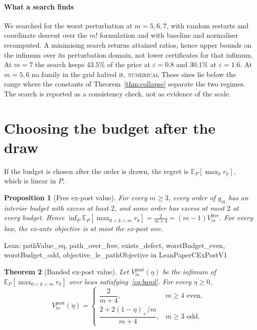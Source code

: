 \documentclass[conference]{IEEEtran}
\newtheorem{theorem}{Theorem}
\newtheorem{proposition}[theorem]{Proposition}
\theoremstyle{definition}
\newcommand{\lean}[1]{\textsf{\footnotesize #1}}
\newcommand{\leanbox}[1]{%
  \par\vspace{2pt}\noindent
  {\raggedright\footnotesize\textsf{Lean: #1}\par}\vspace{2pt}}
\newcommand{\NUM}{\textsc{numerical}}
\begin{document}
\paragraph{What a search finds}
We searched for the worst perturbation at $m=5,6,7$, with random restarts and coordinate
descent over the $m!$ formulation and with baseline and normaliser recomputed. A minimising search returns
attained ratios, hence upper bounds on the infimum over its perturbation domain, not lower
certificates for that infimum. At $m=7$ the search keeps $43.5\%$
of the price at $\varepsilon=0.8$ and $30.1\%$ at $\varepsilon=1.6$. At $m=5,6$ no family in
the grid halved it. \NUM{} These sizes lie below the range where the constants of
Theorem~\ref{thm:collapse} separate the two regimes. The search is reported as a consistency
check, not as evidence of the scale.

\section{Choosing the budget after the draw}
\label{sec:expost}

If the budget is chosen after the order is drawn, the regret is
$\mathbb{E}_{P}[\max_{k}r_{k}]$, which is linear in $P$.

\begin{proposition}[Free ex-post value]
\label{prop:expost}
For every $m\ge3$, every order of $g_{m}$ has an interior budget with excess at least $2$,
and some order has excess at most $2$ at every budget. Hence
$\inf_{P}\mathbb{E}_{P}[\max_{0<k<m}r_{k}]=\frac{2}{m+4}=(m-1)V^{\mathrm{free}}_{m}$. For
every law, the ex-ante objective is at most the ex-post one.
\end{proposition}

\leanbox{\lean{pathValue\_eq}, \lean{path\_over\_free}, \lean{exists\_defect},
\lean{worstBudget\_even}, \lean{worstBudget\_odd},
\lean{objective\_le\_pathObjective} in \lean{LeanPaperCExPostV1}}

\begin{theorem}[Banded ex-post value]
\label{thm:expostband}
Let $V^{\mathrm{post}}_{m}(\eta)$ be the infimum of $\mathbb{E}_{P}[\max_{0<k<m}r_{k}]$ over laws
satisfying~\eqref{eq:band}. For every $\eta\ge0$,
\[
V^{\mathrm{post}}_{m}(\eta)=
\begin{cases}
\dfrac{2}{m+4}, & m\ge4\text{ even},\\[8pt]
\dfrac{2+2(1-\eta)_{+}/m}{m+4}, & m\ge3\text{ odd}.
\end{cases}
\]
\end{theorem}
\end{document}
